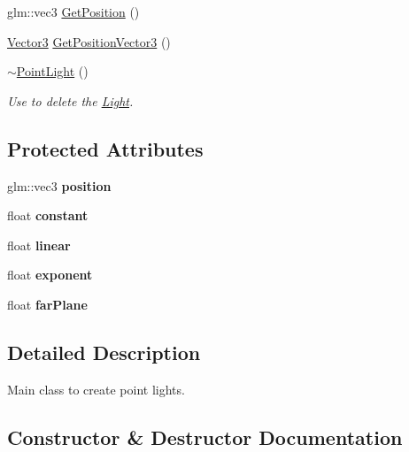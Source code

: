 \begin{DoxyCompactItemize}
glm\+::vec3 \mbox{\hyperlink{class_point_light_aa0325f850903c1e8e6aacbb870d9d1a0}{Get\+Position}} ()
\item 
\mbox{\hyperlink{struct_vector3}{Vector3}} \mbox{\hyperlink{class_point_light_a13eb1498c87c75171311c9e87c8f1d01}{Get\+Position\+Vector3}} ()
\item 
\mbox{\label{class_point_light_aa12d9005d5372dbbe655a82231634341}} 
\mbox{\hyperlink{class_point_light_aa12d9005d5372dbbe655a82231634341}{$\sim$\+Point\+Light}} ()
\begin{DoxyCompactList}\small\item\em Use to delete the \mbox{\hyperlink{class_light}{Light}}. \end{DoxyCompactList}\end{DoxyCompactItemize}
\subsection*{Protected Attributes}
\begin{DoxyCompactItemize}
\item 
\mbox{\label{class_point_light_a6dc6e70f9a91e8a6bbecf08707143cad}} 
glm\+::vec3 {\bfseries position}
\item 
\mbox{\label{class_point_light_a965104c9c660615ba35721c7aac7c262}} 
float {\bfseries constant}
\item 
\mbox{\label{class_point_light_a491f53e12fd4f689550ea8bfb6d68d19}} 
float {\bfseries linear}
\item 
\mbox{\label{class_point_light_a0d722c2916cbfca9bdec0816a646efb9}} 
float {\bfseries exponent}
\item 
\mbox{\label{class_point_light_a0344e29b1bf922ff9b4a35788c0a4283}} 
float {\bfseries far\+Plane}
\end{DoxyCompactItemize}


\subsection{Detailed Description}
Main class to create point lights. 

\subsection{Constructor \& Destructor Documentation}
\mbox{\label{class_point_light_aeb669be7e03cd019c39adcdccbf78025}} 
